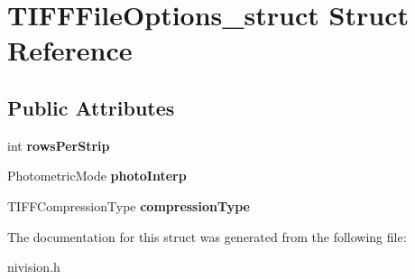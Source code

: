 \hypertarget{structTIFFFileOptions__struct}{\section{\-T\-I\-F\-F\-File\-Options\-\_\-struct \-Struct \-Reference}
\label{structTIFFFileOptions__struct}
}
\subsection*{\-Public \-Attributes}
\begin{DoxyCompactItemize}
\item 
\hypertarget{structTIFFFileOptions__struct_afaec3c3fc698400ae541bc01ec5e9a4e}{int {\bfseries rows\-Per\-Strip}}\label{structTIFFFileOptions__struct_afaec3c3fc698400ae541bc01ec5e9a4e}

\item 
\hypertarget{structTIFFFileOptions__struct_a5221c7751b08d786905a50ae4e196f4e}{\-Photometric\-Mode {\bfseries photo\-Interp}}\label{structTIFFFileOptions__struct_a5221c7751b08d786905a50ae4e196f4e}

\item 
\hypertarget{structTIFFFileOptions__struct_aab09c7b3d6e3f251075bb8491049c529}{\-T\-I\-F\-F\-Compression\-Type {\bfseries compression\-Type}}\label{structTIFFFileOptions__struct_aab09c7b3d6e3f251075bb8491049c529}

\end{DoxyCompactItemize}


\-The documentation for this struct was generated from the following file\-:\begin{DoxyCompactItemize}
\item 
nivision.\-h\end{DoxyCompactItemize}
